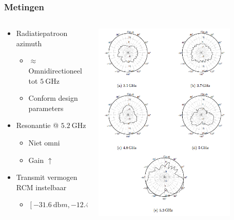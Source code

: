 \documentclass{beamer}
\begin{document}
  \begin{frame}
  \frametitle{Metingen}
  	\begin{columns}[c]
  	\begin{column}{0.5\textwidth}
  		\begin{itemize}
  			\item Radiatiepatroon azimuth
  			\begin{itemize}
  				\item $\approx$ Omnidirectioneel tot $\SI{5}{\giga\hertz}$
  				\item Conform design parameters\\
  			\end{itemize}
  			\item Resonantie @ $\SI{5.2}{\giga\hertz}$
  			\begin{itemize}
  				\item Niet omni
  				\item Gain $\uparrow$
  			\end{itemize}
  			\item Transmit vermogen RCM instelbaar
  			\begin{itemize}
  				\item $[\SI{-31.6}{\decibel}m , \SI{-12.46}{\decibel}m]$
  			\end{itemize}
  		\end{itemize}
  	\end{column}
  	\begin{column}{0.5\textwidth}
  		\includegraphics[width=0.8\textwidth]{images/ant_rad_pat.png}
  	\end{column}
  	\end{columns}
  \end{frame}
\end{document}
